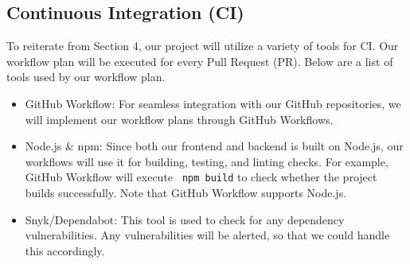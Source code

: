 \documentclass{article}
\begin{document}
\subsection{Continuous Integration (CI)}
To reiterate from Section 4, our project will utilize a variety of tools for CI. Our workflow plan will be executed for every Pull Request (PR). Below are a list of tools used by our workflow plan.
\begin{itemize}
	\item GitHub Workflow: For seamless integration with our GitHub repositories, we will implement our workflow plans through GitHub Workflows.  
	\item Node.js \& npm: Since both our frontend and backend is built on Node.js, our workflows will use it for building, testing, and linting checks. For example, GitHub Workflow will execute \verb| npm build| to check whether the project builds successfully. Note that GitHub Workflow supports Node.js.
	\item Snyk/Dependabot: This tool is used to check for any dependency vulnerabilities. Any vulnerabilities will be alerted, so that we could handle this accordingly.
\end{itemize}
\end{document}
